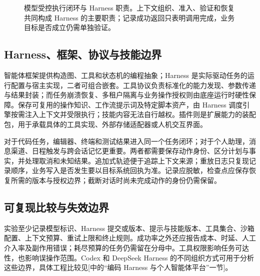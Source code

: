 \documentclass[../textbook.tex]{subfiles}
\begin{document}
\begin{figure}[htbp]
\centering
{}
\caption[模型受控执行闭环与 Harness 职责]{模型受控执行闭环与 Harness 职责。上下文组织、准入、验证和恢复共同构成 Harness 的主要职责；记录成功返回只表明调用完成，业务目标是否成立仍需单独验证。}\label{fig:agent-harness-loop}
\end{figure}

\subsection{Harness、框架、协议与技能边界}
智能体框架提供构造图、工具和状态机的编程抽象；Harness 是实际驱动任务的运行配置与宿主实现，二者可组合嵌套。工具协议负责标准化的能力发现、参数传递与结果封装；而任务崩溃恢复、多租户隔离与业务操作授权则由底座运行时硬性保障。保存可复用的操作知识、工作流提示词及特定脚本资产，由 Harness 调度引擎按需注入上下文并受限执行；技能内容无法自行越权。插件则是扩展能力的装配包，用于承载具体的工具实现、外部存储适配器或人机交互界面。

对于代码任务，编辑器、终端和测试结果进入同一个任务闭环；对于个人助理，消息渠道、日程触发与跨会话记忆更重要。两者都需要保存动作身份、区分计划与事实，并处理取消和未知结果。追加式轨迹便于追踪上下文来源；重放日志只复现记录顺序，业务写入是否发生要以目标系统回执为准。记录应脱敏，检查点应保存恢复所需的版本与授权边界；截断对话时尚未完成动作的身份仍需保留。

\subsection{可复现比较与失效边界}
实验至少记录模型标识、Harness 提交或版本、提示与技能版本、工具集合、沙箱配置、上下文预算、重试上限和终止规则。成功率之外还应报告成本、时延、人工介入率及副作用错误；耗尽预算的任务仍需留在分母中。工具权限影响任务可达性，也影响误操作范围。Codex 和 DeepSeek Harness 的不同组织方式可用于分析这些边界，具体工程比较见[中的“编码 Harness 与个人智能体平台”一节]。
\end{document}
